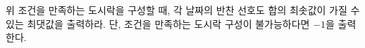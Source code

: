 
위 조건을 만족하는 도시락을 구성할 때, 각 날짜의 반찬 선호도 합의 최솟값이 가질 수 있는 최댓값을 출력하라. 단, 조건을 만족하는 도시락 구성이 불가능하다면 $-1$을 출력한다.
